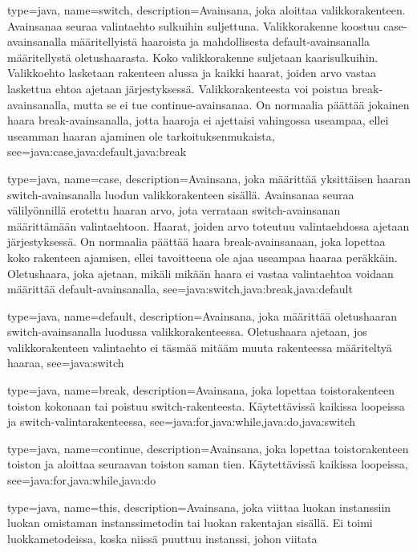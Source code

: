 {
	type=java,
	name=switch,
	description={Avainsana, joka aloittaa valikkorakenteen. Avainsanaa seuraa valintaehto
sulkuihin suljettuna. Valikkorakenne koostuu case-avainsanalla määritellyistä haaroista ja
mahdollisesta default-avainsanalla määritellystä oletushaarasta. Koko valikkorakenne suljetaan
kaarisulkuihin. Valikkoehto lasketaan rakenteen alussa ja kaikki haarat, joiden arvo vastaa
laskettua ehtoa ajetaan järjestyksessä. Valikkorakenteesta voi poistua break-avainsanalla, mutta
se ei tue continue-avainsanaa. On normaalia päättää jokainen haara break-avainsanalla, jotta
haaroja ei ajettaisi vahingossa useampaa, ellei useamman haaran ajaminen ole
tarkoituksenmukaista},
	see={java:case,java:default,java:break}
}

{
	type=java,
	name=case,
	description={Avainsana, joka määrittää yksittäisen haaran switch-avainsanalla luodun
valikkorakenteen sisällä. Avainsanaa seuraa välilyönnillä erotettu haaran arvo, jota verrataan
switch-avainsanan määrittämään valintaehtoon. Haarat, joiden arvo toteutuu valintaehdossa ajetaan
järjestyksessä. On normaalia päättää haara break-avainsanaan, joka lopettaa koko rakenteen
ajamisen, ellei tavoitteena ole ajaa useampaa haaraa peräkkäin. Oletushaara, joka ajetaan, mikäli
mikään haara ei vastaa valintaehtoa voidaan määrittää default-avainsanalla},
	see={java:switch,java:break,java:default}
}

{
	type=java,
	name=default,
	description={Avainsana, joka määrittää oletushaaran switch-avainsanalla luodussa
valikkorakenteessa. Oletushaara ajetaan, jos valikkorakenteen valintaehto ei täsmää mitääm muuta
rakenteessa määriteltyä haaraa},
	see=java:switch
}

{
	type=java,
	name=break,
	description={Avainsana, joka lopettaa toistorakenteen toiston kokonaan tai poistuu
switch-rakenteesta. Käytettävissä kaikissa loopeissa ja switch-valintarakenteessa},
	see={java:for,java:while,java:do,java:switch}
}

{
	type=java,
	name=continue,
	description={Avainsana, joka lopettaa toistorakenteen toiston ja aloittaa seuraavan toiston
saman tien. Käytettävissä kaikissa loopeissa},
	see={java:for,java:while,java:do}
}

{
	type=java,
	name=this,
	description={Avainsana, joka viittaa luokan instanssiin luokan omistaman instanssimetodin tai
luokan rakentajan sisällä. Ei toimi luokkametodeissa, koska niissä puuttuu instanssi, johon
viitata}
}

